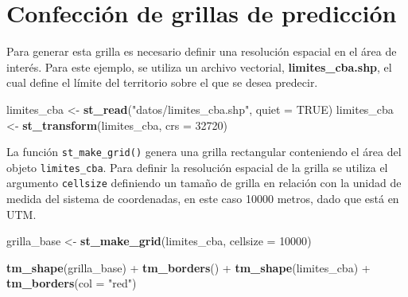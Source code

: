 \documentclass[11pt,b5paper,]{krantz}
\newenvironment{Shaded}{}{}
\newcommand{\DataTypeTok}[1]{\textcolor[rgb]{0.56,0.13,0.00}{#1}}
\newcommand{\DecValTok}[1]{\textcolor[rgb]{0.25,0.63,0.44}{#1}}
\newcommand{\KeywordTok}[1]{\textcolor[rgb]{0.00,0.44,0.13}{\textbf{#1}}}
\newcommand{\NormalTok}[1]{#1}
\newcommand{\OperatorTok}[1]{\textcolor[rgb]{0.40,0.40,0.40}{#1}}
\newcommand{\OtherTok}[1]{\textcolor[rgb]{0.00,0.44,0.13}{#1}}
\newcommand{\StringTok}[1]{\textcolor[rgb]{0.25,0.44,0.63}{#1}}
\begin{document}
\hypertarget{confecciuxf3n-de-grillas-de-predicciuxf3n}{%
\section{Confección de grillas de predicción}\label{confecciuxf3n-de-grillas-de-predicciuxf3n}}

Para generar esta grilla es necesario definir una resolución espacial en el área de interés. Para este ejemplo, se utiliza un archivo vectorial, \textbf{limites\_cba.shp}, el cual define el límite del territorio sobre el que se desea predecir.

\begin{Shaded}
\begin{Highlighting}[]
\NormalTok{limites_cba <-}\StringTok{ }\KeywordTok{st_read}\NormalTok{(}\StringTok{"datos/limites_cba.shp"}\NormalTok{,}
                       \DataTypeTok{quiet =} \OtherTok{TRUE}\NormalTok{)}
\NormalTok{limites_cba <-}\StringTok{ }\KeywordTok{st_transform}\NormalTok{(limites_cba, }
                            \DataTypeTok{crs =} \DecValTok{32720}\NormalTok{)}
\end{Highlighting}
\end{Shaded}

La función \texttt{st\_make\_grid()} genera una grilla rectangular conteniendo el área del objeto \texttt{limites\_cba}. Para definir la resolución espacial de la grilla se utiliza el argumento \texttt{cellsize} definiendo un tamaño de grilla en relación con la unidad de medida del sistema de coordenadas, en este caso 10000 metros, dado que está en UTM.

\begin{Shaded}
\begin{Highlighting}[]
\NormalTok{grilla_base <-}\StringTok{ }\KeywordTok{st_make_grid}\NormalTok{(limites_cba, }
                            \DataTypeTok{cellsize =} \DecValTok{10000}\NormalTok{)}

\KeywordTok{tm_shape}\NormalTok{(grilla_base) }\OperatorTok{+}
\StringTok{  }\KeywordTok{tm_borders}\NormalTok{() }\OperatorTok{+}
\StringTok{  }\KeywordTok{tm_shape}\NormalTok{(limites_cba) }\OperatorTok{+}
\StringTok{  }\KeywordTok{tm_borders}\NormalTok{(}\DataTypeTok{col =} \StringTok{"red"}\NormalTok{)}
\end{Highlighting}
\end{Shaded}
\end{document}
